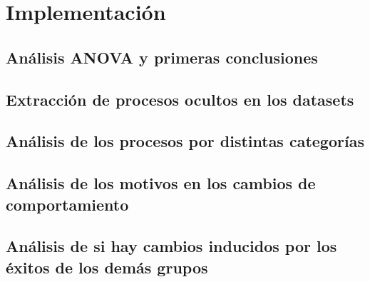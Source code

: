 \chapter{Implementación}
	\label{chap:six}
	
\section{Análisis ANOVA y primeras conclusiones}


\section{Extracción de procesos ocultos en los datasets}


\section{Análisis de los procesos por distintas categorías}


\section{Análisis de los motivos en los cambios de comportamiento}


\section{Análisis de si hay cambios inducidos por los éxitos de los demás grupos}
